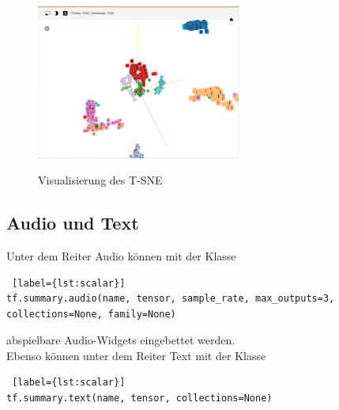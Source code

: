 \begin{itemize}
\begin{figure}[h!]
	\centering
	 \includegraphics[width=0.6\textwidth]{images/Kapitel_3/projektor_t-sne.png}\\
	\vspace{10pt} 
	\caption[Visualisierung des T-SNE]{Visualisierung des T-SNE}
	\label{fig:histogram}
\end{figure}

\end{itemize}


\subsection{Audio und Text}

Unter dem Reiter Audio können mit der Klasse
\\

\begin{minipage}{\linewidth}
\begin{lstlisting} [label={lst:scalar}]
tf.summary.audio(name, tensor, sample_rate, max_outputs=3, collections=None, family=None)
\end{lstlisting}
\end{minipage}
\vspace{0.2cm}

abspielbare Audio-Widgets eingebettet werden.\\

Ebenso können unter dem Reiter Text mit der Klasse
\\

\begin{minipage}{\linewidth}
\begin{lstlisting} [label={lst:scalar}]
tf.summary.text(name, tensor, collections=None)
\end{lstlisting}
\end{minipage}
\vspace{0.2cm}

